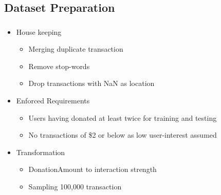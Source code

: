 \documentclass[aspectratio=169]{beamer}
\begin{document}
\subsection{Dataset Preparation}
\begin{frame}
	\frametitle{\insertsection}
	\framesubtitle{\insertsubsection}

	\begin{itemize}
		\item House keeping
		\begin{itemize}
			\item Merging duplicate transaction
			\item Remove stop-words
			\item Drop transactions with NaN as location
		\end{itemize}
		\item Enforced Requirements
		\begin{itemize}
			\item Users having donated at least twice for training and testing
			\item No transactions of \$2 or below as low user-interest assumed
		\end{itemize}
		\item Transformation
		\begin{itemize}
			\item DonationAmount to interaction strength
			\item Sampling 100,000 transaction
		\end{itemize}
	\end{itemize}
\end{frame}
\end{document}
